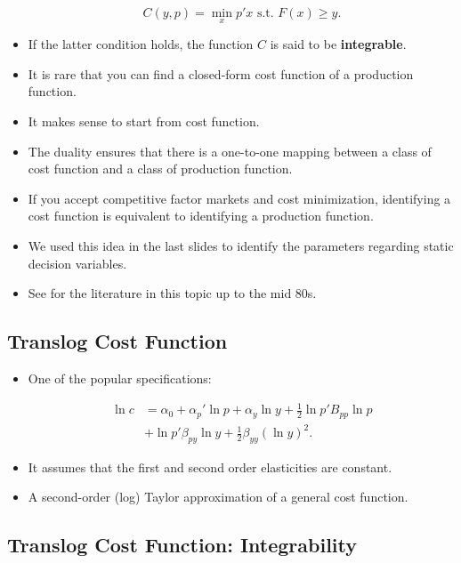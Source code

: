 \documentclass[]{book}
\providecommand{\tightlist}{%
  \setlength{\itemsep}{0pt}\setlength{\parskip}{0pt}}
\begin{document}
\begin{itemize}
  \begin{equation}
  C(y, p) = \min_{x} p'x \text{   s.t.   } F(x) \ge y.
  \end{equation}
\item
  If the latter condition holds, the function \(C\) is said to be
  \textbf{integrable}.
\item
  It is rare that you can find a closed-form cost function of a
  production function.
\item
  It makes sense to start from cost function.
\item
  The duality ensures that there is a one-to-one mapping between a class
  of cost function and a class of production function.
\item
  If you accept competitive factor markets and cost minimization,
  identifying a cost function is equivalent to identifying a production
  function.
\item
  We used this idea in the last slides to identify the parameters
  regarding static decision variables.
\item
  See \citet{Jorgenson1986} for the literature in this topic up to the
  mid 80s.
\end{itemize}

\subsection{Translog Cost Function}\label{translog-cost-function}

\begin{itemize}
\tightlist
\item
  One of the popular specifications:

  \begin{equation}
  \begin{split}
  \ln c &= \alpha_0 + \alpha_p' \ln p + \alpha_y \ln y + \frac{1}{2} \ln p' B_{pp} \ln p\\
  & + \ln p' \beta_{py} \ln y + \frac{1}{2}\beta_{yy}(\ln y)^2.
  \end{split}
  \end{equation}
\item
  It assumes that the first and second order elasticities are constant.
\item
  A second-order (log) Taylor approximation of a general cost function.
\end{itemize}

\subsection{Translog Cost Function:
Integrability}\label{translog-cost-function-integrability}
\end{document}
